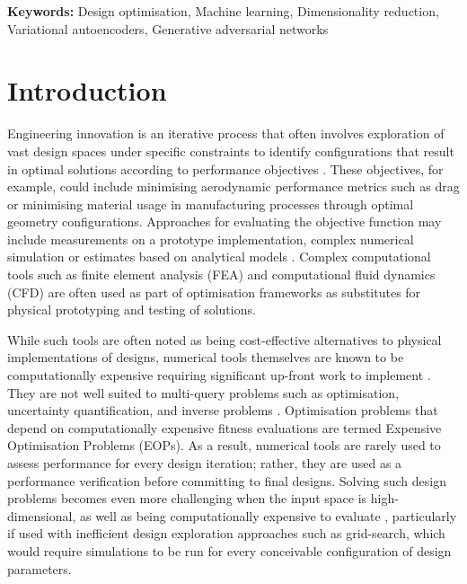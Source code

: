 \documentclass{article}
\begin{document}
\noindent \textbf{Keywords:} Design optimisation, Machine learning, Dimensionality reduction, Variational autoencoders, Generative adversarial networks
\newpage

\tableofcontents  %
\newpage          %

\section{Introduction}

Engineering innovation is an iterative process that often involves exploration of vast design spaces under specific constraints to identify configurations that result in optimal solutions according to performance objectives \citep{Yamada2022}. These objectives, for example, could include minimising aerodynamic performance metrics such as drag or minimising material usage in manufacturing processes through optimal geometry configurations. Approaches for evaluating the objective function may include measurements on a prototype implementation, complex numerical simulation or estimates based on analytical models \citep{Pimentel2022}. Complex computational tools such as finite element analysis (FEA) and computational fluid dynamics (CFD) \citep{Archbold2024} are often used as part of optimisation frameworks as substitutes for physical prototyping and testing of solutions. 

While such tools are often noted as being cost-effective alternatives to physical implementations of designs, numerical tools themselves are known to be computationally expensive requiring significant up-front work to implement \citep{Shi2010}. They are not well suited to multi-query problems such as optimisation, uncertainty quantification, and inverse problems \citep{Archbold2024}. Optimisation problems that depend on computationally expensive fitness evaluations are termed Expensive Optimisation Problems (EOPs)\citep{Ren2025}. As a result, numerical tools are rarely used to assess performance for every design iteration; rather, they are used as a performance verification before committing to final designs. Solving such design problems becomes even more challenging when the input space is high-dimensional, as well as being computationally expensive to evaluate \citep{Tripp2020}, particularly if used with inefficient design exploration approaches such as grid-search, which would require simulations to be run for every conceivable configuration of design parameters. 
\end{document}
